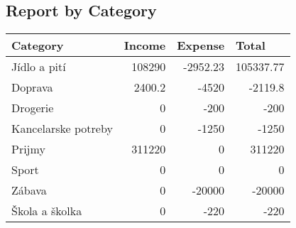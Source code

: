 \documentclass{article}
\begin{document}
        \subsection*{Report by Category}
        \begin{tabular}{ | l | l | l | l | }
        \hline               

        \bfseries Category &
        \bfseries Income &
        \bfseries Expense &
        \bfseries Total \\
        \hline

        Jídlo a pití &
            \multicolumn{1}{|r|}{108290} &
            \multicolumn{1}{|r|}{-2952.23} &
            \multicolumn{1}{|r|}{105337.77} \\
            \hline 
        Doprava &
            \multicolumn{1}{|r|}{2400.2} &
            \multicolumn{1}{|r|}{-4520} &
            \multicolumn{1}{|r|}{-2119.8} \\
            \hline 
        Drogerie &
            \multicolumn{1}{|r|}{0} &
            \multicolumn{1}{|r|}{-200} &
            \multicolumn{1}{|r|}{-200} \\
            \hline 
        Kancelarske potreby &
            \multicolumn{1}{|r|}{0} &
            \multicolumn{1}{|r|}{-1250} &
            \multicolumn{1}{|r|}{-1250} \\
            \hline 
        Prijmy &
            \multicolumn{1}{|r|}{311220} &
            \multicolumn{1}{|r|}{0} &
            \multicolumn{1}{|r|}{311220} \\
            \hline 
        Sport &
            \multicolumn{1}{|r|}{0} &
            \multicolumn{1}{|r|}{0} &
            \multicolumn{1}{|r|}{0} \\
            \hline 
        Zábava &
            \multicolumn{1}{|r|}{0} &
            \multicolumn{1}{|r|}{-20000} &
            \multicolumn{1}{|r|}{-20000} \\
            \hline 
        Škola a školka &
            \multicolumn{1}{|r|}{0} &
            \multicolumn{1}{|r|}{-220} &
            \multicolumn{1}{|r|}{-220} \\
            \hline 
        
        
        \hline  
        \end{tabular}
        
\end{document}
